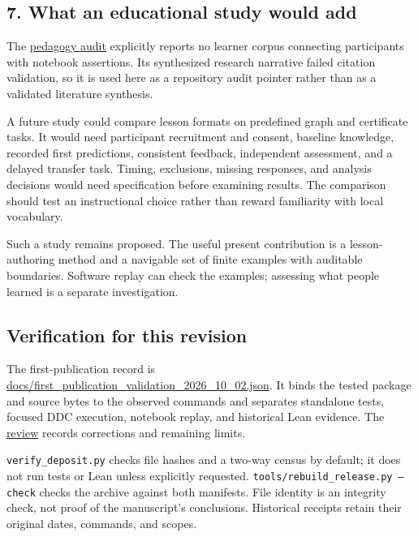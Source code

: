 \documentclass[
  11pt,
]{article}
\begin{document}
\hypertarget{what-an-educational-study-would-add}{%
\subsection{7. What an educational study would
add}\label{what-an-educational-study-would-add}}

The
\href{https://github.com/dbccpage/the_symbol_game/blob/52cb5457f6c485ba548cfd292f6012a941ed22cf/omega_engine_education/pedagogy/teaching_and_learning_findings.md}{pedagogy
audit} explicitly reports no learner corpus connecting participants with
notebook assertions. Its synthesized research narrative failed citation
validation, so it is used here as a repository audit pointer rather than
as a validated literature synthesis.

A future study could compare lesson formats on predefined graph and
certificate tasks. It would need participant recruitment and consent,
baseline knowledge, recorded first predictions, consistent feedback,
independent assessment, and a delayed transfer task. Timing, exclusions,
missing responses, and analysis decisions would need specification
before examining results. The comparison should test an instructional
choice rather than reward familiarity with local vocabulary.

Such a study remains proposed. The useful present contribution is a
lesson-authoring method and a navigable set of finite examples with
auditable boundaries. Software replay can check the examples; assessing
what people learned is a separate investigation.

\hypertarget{verification-for-this-revision}{%
\subsection{Verification for this
revision}\label{verification-for-this-revision}}

The first-publication record is
\url{docs/first_publication_validation_2026_10_02.json}. It binds the
tested package and source bytes to the observed commands and separates
standalone tests, focused DDC execution, notebook replay, and historical
Lean evidence. The \href{docs/first_publication_review.md}{review}
records corrections and remaining limits.

\texttt{\nolinkurl{verify_deposit.py}} checks file hashes and a
two-way census by default; it does not run tests or Lean unless
explicitly requested.
\texttt{tools/rebuild\_release.py --check} checks the
archive against both manifests. File identity is an integrity check, not
proof of the manuscript's conclusions. Historical receipts retain their
original dates, commands, and scopes.
\end{document}
